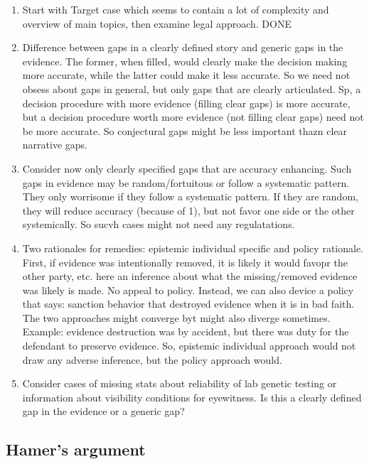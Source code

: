 \documentclass[
  10pt,
  dvipsnames,enabledeprecatedfontcommands]{scrartcl}
\begin{document}
\begin{enumerate}
\def\labelenumi{(\arabic{enumi})}
\setcounter{enumi}{-1}
\item
  Start with Target case which seems to contain a lot of complexity and
  overview of main topics, then examine legal approach. DONE
\item
  Difference between gaps in a clearly defined story and generic gaps in
  the evidence. The former, when filled, would clearly make the decision
  making more accurate, while the latter could make it less accurate. So
  we need not obsess about gaps in general, but only gaps that are
  clearly articulated. Sp, a decision procedure with more evidence
  (filling clear gaps) is more accurate, but a decision procedure worth
  more evidence (not filling clear gaps) need not be more accurate. So
  conjectural gaps might be less important thazn clear narrative gaps.
\item
  Consider now only clearly specified gaps that are accuracy enhancing.
  Such gaps in evidence may be random/fortuitous or follow a systematic
  pattern. They only worrisome if they follow a systematic pattern. If
  they are random, they will reduce accuracy (because of 1), but not
  favor one side or the other systemically. So sucvh cases might not
  need any regulatations.
\item
  Two rationales for remedies: epistemic individual specific and policy
  rationale. First, if evidence was intentionally removed, it is likely
  it would favopr the other party, etc. here an inference about what the
  missing/removed evidence was likely is made. No appeal to policy.
  Instead, we can also device a policy that says: sanction behavior that
  destroyed evidence when it is in bad faith. The two approaches might
  converge byt might also diverge sometimes. Example: evidence
  destruction was by accident, but there was duty for the defendant to
  preserve evidence. So, epistemic individual approach would not draw
  any adverse inference, but the policy approach would.
\item
  Consider cases of missing stats about reliability of lab genetic
  testing or information about visibility conditions for eyewitness. Is
  this a clearly defined gap in the evidence or a generic gap?
\end{enumerate}

\hypertarget{hamers-argument}{%
\subsection{Hamer's argument}\label{hamers-argument}}
\end{document}
